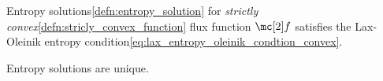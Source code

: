 \begin{propertybox}\nospacing
    \begin{property}
        Entropy solutions\cref{defn:entropy_solution} for \textit{strictly convex}\cref{defn:stricly_convex_function} flux function $\flux$
        satisfies the Lax-Oleinik entropy condition\cref{eq:lax_entropy_oleinik_condtion_convex}.
    \end{property}
\end{propertybox}
\begin{propertybox}\nospacing
    \begin{property}
        Entropy solutions are unique.
    \end{property}
\end{propertybox}
